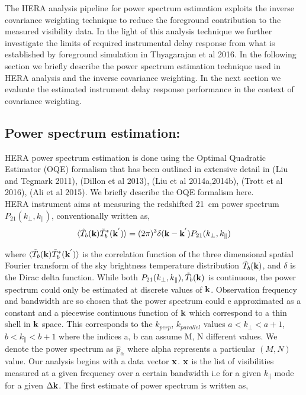 \documentclass[twocolumn]{emulateapj}
\begin{document}
The HERA analysis pipeline for power spectrum estimation exploits the inverse covariance weighting technique to reduce the foreground contribution to the measured visibility data. In the light of this analysis technique we further investigate the limits of required instrumental delay response from what is established by foreground simulation in Thyagarajan et al 2016. In the following section we briefly describe the power spectrum estimation technique used in HERA analysis and the inverse covariance weighting. In the next section we evaluate the estimated instrument delay response performance in the context of covariance weighting.

\subsection{Power spectrum estimation:}
HERA power spectrum estimation is done using the Optimal Quadratic Estimator (OQE) formalism that has been outlined in extensive detail in (Liu and Tegmark 2011), (Dillon et al 2013), (Liu et al 2014a,2014b), (Trott et al 2016), (Ali et al 2015). We briefly  describe the OQE formalism here.\\
HERA instrument aims at measuring the redshifted 21~cm power spectrum $P_{21}(k_\perp,k_\parallel)$, conventionally written as, 
\begin{equation}
\langle  \tilde T_{b}(\bold k) \tilde T_{b}^{*}(\bold k^{'}) \rangle = (2\pi)^{3} \delta (\bold k - \bold k^{'})P_{21}(k_\perp,k_\parallel)
\label{eq14}
\end{equation}

where $\langle  \tilde T_{b}(\bold k) \tilde T_{b}^{*}(\bold k^{'}) \rangle $ is the correlation function of the three dimensional spatial Fourier transform of the sky brightness temperature distribution $ \tilde T_{b}(\bold k)$, and $\delta$ is the Dirac delta function. While both $P_{21}(k_\perp,k_\parallel), \tilde T_{b}({\bold k})$ is continuous, the power spectrum could only be estimated at discrete values of $\bold k$. Observation frequency and bandwidth are so chosen that the power spectrum could e approximated as a constant and a piecewise continuous function of $\bold k$  which correspond to a thin shell in $\bold k$ space. This corresponds to the $k_{perp}$, $k_{parallel}$  values $a <k_{\perp} < a+1$, $b <k_{\parallel} < b+1$ where the indices a, b can assume M, N different values.  We denote the power spectrum as $\hat p_{\alpha}$ where alpha represents a particular $(M,N)$ value. Our analysis begins with a data vector $\bold x$. $\bold x$ is the list of visibilities measured at a given frequency over a certain bandwidth i.e for a given $k_{\parallel}$ mode for a given $\Delta \bold k $. The first estimate of power spectrum is written as, 
\end{document}

